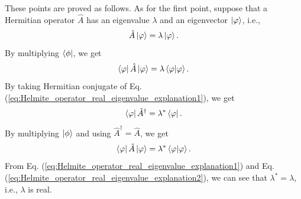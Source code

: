 These points are proved as follows. As for the first point, suppose that a Hermitian operator $\hat A$ has an eigenvalue $\lambda$ and an eigenvector $\ket \varphi$, i.e.,
\begin{equation}
  \hat A\ket \varphi = \lambda \ket \varphi.
  \label{eq:Helmite_operator_real_eigenvalue_explanation1}
\end{equation}
By multiplying $\bra \phi$, we get
\begin{equation}
  \bra \varphi \hat A \ket \varphi = \lambda \braket{\varphi|\varphi}.
\end{equation}
By taking Hermitian conjugate of Eq. (\ref{eq:Helmite_operator_real_eigenvalue_explanation1}), we get
\begin{equation}
  \bra \varphi \hat A^\dagger = \lambda^* \bra \varphi.
\end{equation}
By multiplying $\ket \phi$ and using $\hat A^\dagger = \hat A$, we get
\begin{equation}
  \bra\varphi \hat A \ket \varphi = \lambda^*\braket{\varphi|\varphi}.
  \label{eq:Helmite_operator_real_eigenvalue_explanation2}
\end{equation}
From Eq. (\ref{eq:Helmite_operator_real_eigenvalue_explanation1}) and Eq. (\ref{eq:Helmite_operator_real_eigenvalue_explanation2}), we can see that $\lambda^* = \lambda$, i.e., $\lambda$ is real. 

